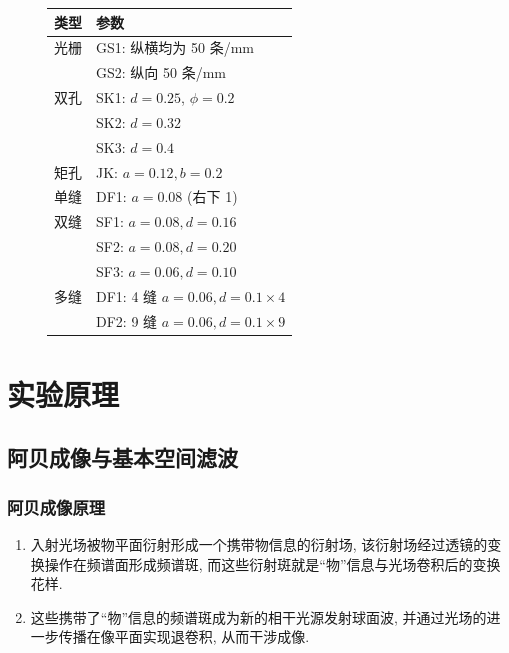 \documentclass[zihao=5, UTF8]{article}
\theoremstyle{MyLineTheoremStyle} %
\theoremstyle{MyBlockTheoremStyle} %
\theoremstyle{MySubsubsectionStyle} %
\begin{document}
\begin{figure}[H]
\begin{minipage}[t]{0.45\textwidth}
        \begin{tabular}{@{}ll@{}}
        \toprule
        \textbf{类型} & \textbf{参数} \\
        \midrule
        光栅 & GS1: 纵横均为 50 条/mm \\
            & GS2: 纵向 50 条/mm \\
        双孔 & SK1: \(d=0.25\), \(\phi=0.2\) \\
            & SK2: \(d=0.32\) \\
            & SK3: \(d=0.4\) \\
        矩孔 & JK: \(a=0.12, b=0.2\) \\
        单缝 & DF1: \(a=0.08\) (右下 1) \\
        双缝 & SF1: \(a=0.08, d=0.16\) \\
            & SF2: \(a=0.08, d=0.20\) \\
            & SF3: \(a=0.06, d=0.10\) \\
        多缝 & DF1: 4 缝 \(a=0.06, d=0.1 \times 4\) \\
            & DF2: 9 缝 \(a=0.06, d=0.1 \times 9\) \\
        \bottomrule
        \end{tabular}

    \end{minipage}
\end{figure}
\section{实验原理}

\subsection{阿贝成像与基本空间滤波}

\subsubsection{阿贝成像原理}

\begin{enumerate}
    \item 入射光场被物平面衍射形成一个携带物信息的衍射场, 该衍射场经过透镜的变换操作在频谱面形成频谱斑, 而这些衍射斑就是“物”信息与光场卷积后的变换花样. 
    \item 这些携带了“物”信息的频谱斑成为新的相干光源发射球面波, 并通过光场的进一步传播在像平面实现退卷积, 从而干涉成像. 
\end{enumerate}
\end{document}
